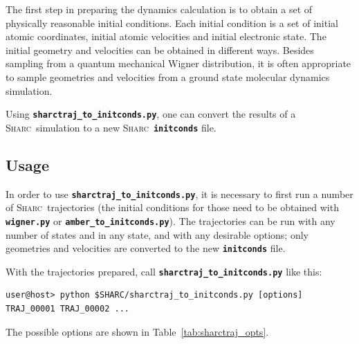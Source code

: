 \documentclass[a4paper,10pt,DIV=15,openany,twoside=false]{scrbook}
\newcommand{\sharc}{\textsc{Sharc}}
\newcommand{\ttt}[1]{\textbf{\texttt{#1}}}
\begin{document}
The first step in preparing the dynamics calculation is to obtain a set of physically reasonable initial conditions. Each initial condition is a set of initial atomic coordinates, initial atomic velocities and initial electronic state. The initial geometry and velocities can be obtained in different ways. 
Besides sampling from a quantum mechanical Wigner distribution, it is often appropriate to sample geometries and velocities from a ground state molecular dynamics simulation.

Using \ttt{sharctraj\_to\_initconds.py}, one can convert the results of a \sharc\ simulation to a new \sharc\ \ttt{initconds} file.

\subsection{Usage}

In order to use \ttt{sharctraj\_to\_initconds.py}, it is necessary to first run a number of \sharc\ trajectories (the initial conditions for those need to be obtained with \ttt{wigner.py} or \ttt{amber\_to\_initconds.py}).
The trajectories can be run with any number of states and in any state, and with any desirable options; only geometries and velocities are converted to the new \ttt{initconds} file.

With the trajectories prepared, call \ttt{sharctraj\_to\_initconds.py} like this:
\begin{verbatim}
user@host> python $SHARC/sharctraj_to_initconds.py [options] TRAJ_00001 TRAJ_00002 ...
\end{verbatim}
The possible options are shown in Table~\ref{tab:sharctraj_opts}.
\end{document}
